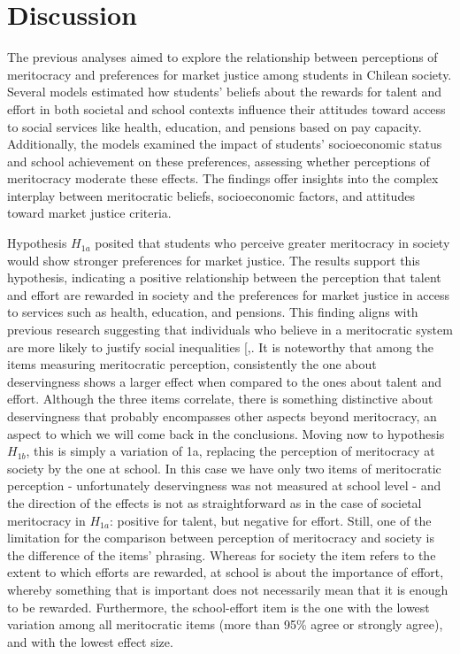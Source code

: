 \documentclass[
  12pt,
  letterpaper,
]{article}
\begin{document}
\section{Discussion}\label{discussion}

The previous analyses aimed to explore the relationship between
perceptions of meritocracy and preferences for market justice among
students in Chilean society. Several models estimated how students'
beliefs about the rewards for talent and effort in both societal and
school contexts influence their attitudes toward access to social
services like health, education, and pensions based on pay capacity.
Additionally, the models examined the impact of students' socioeconomic
status and school achievement on these preferences, assessing whether
perceptions of meritocracy moderate these effects. The findings offer
insights into the complex interplay between meritocratic beliefs,
socioeconomic factors, and attitudes toward market justice criteria.

Hypothesis \(H_{1a}\) posited that students who perceive greater
meritocracy in society would show stronger preferences for market
justice. The results support this hypothesis, indicating a positive
relationship between the perception that talent and effort are rewarded
in society and the preferences for market justice in access to services
such as health, education, and pensions. This finding aligns with
previous research suggesting that individuals who believe in a
meritocratic system are more likely to justify social inequalities
{[},\citeproc{ref-wiederkehr_belief_2015}{4}{]}.
It is noteworthy that among the items measuring meritocratic perception,
consistently the one about deservingness shows a larger effect when
compared to the ones about talent and effort. Although the three items
correlate, there is something distinctive about deservingness that
probably encompasses other aspects beyond meritocracy, an aspect to
which we will come back in the conclusions. Moving now to hypothesis
\(H_{1b}\), this is simply a variation of 1a, replacing the perception
of meritocracy at society by the one at school. In this case we have
only two items of meritocratic perception - unfortunately deservingness
was not measured at school level - and the direction of the effects is
not as straightforward as in the case of societal meritocracy in
\(H_{1a}\): positive for talent, but negative for effort. Still, one of
the limitation for the comparison between perception of meritocracy and
society is the difference of the items' phrasing. Whereas for society
the item refers to the extent to which efforts are rewarded, at school
is about the importance of effort, whereby something that is important
does not necessarily mean that it is enough to be rewarded. Furthermore,
the school-effort item is the one with the lowest variation among all
meritocratic items (more than 95\% agree or strongly agree), and with
the lowest effect size.
\end{document}
